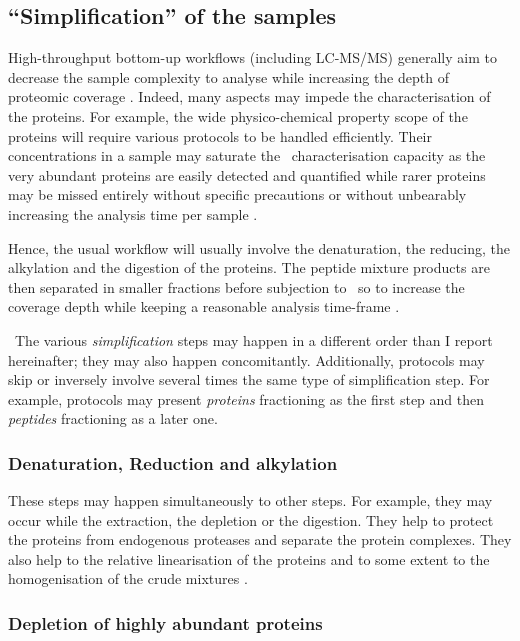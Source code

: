 \subsection{\enquote{Simplification} of the samples}

High-throughput bottom-up workflows (including \gls{LC-MS/MS}) generally
aim to decrease the sample complexity to analyse while increasing the depth
of proteomic coverage . Indeed,
many aspects may impede the characterisation of the proteins.
For example, the wide physico-chemical property scope of the proteins will
require various protocols to be handled efficiently.
Their concentrations in a sample may saturate the \ms\ characterisation capacity
as the very abundant proteins are easily detected and quantified while rarer
proteins may be missed entirely without specific precautions
 or without unbearably increasing the
analysis time per sample .

Hence, the usual workflow will usually involve the denaturation, the reducing,
the alkylation and the digestion of the proteins. The peptide mixture products
are then separated in smaller fractions before subjection to \ms\ so to increase
the coverage depth while keeping a reasonable analysis time-frame
.

\NB\ The various \emph{simplification} steps may happen in a different order
than I report hereinafter; they may also happen concomitantly. Additionally,
protocols may skip or inversely involve several times the same type of
simplification step. For example, protocols may present
\emph{proteins} fractioning as the first step
and then \emph{peptides} fractioning as a later one.

\subsubsection{Denaturation, Reduction and alkylation}

These steps may happen simultaneously to other steps. For example, they may
occur while the extraction, the depletion or the digestion. They help to protect
the proteins from endogenous proteases and separate the protein complexes. They
also help to the relative linearisation of the proteins and to some extent to
the homogenisation of the crude mixtures .

\subsubsection{Depletion of highly abundant proteins}

